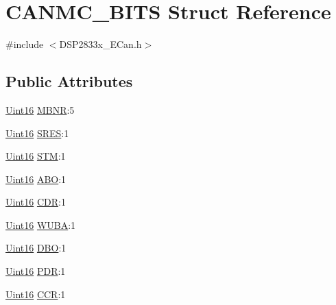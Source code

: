 \hypertarget{struct_c_a_n_m_c___b_i_t_s}{}\section{C\+A\+N\+M\+C\+\_\+\+B\+I\+T\+S Struct Reference}
\label{struct_c_a_n_m_c___b_i_t_s}


{\ttfamily \#include $<$D\+S\+P2833x\+\_\+\+E\+Can.\+h$>$}

\subsection*{Public Attributes}
\begin{DoxyCompactItemize}
\item 
\hyperlink{_d_s_p2833x___device_8h_a59a9f6be4562c327cbfb4f7e8e18f08b}{Uint16} \hyperlink{struct_c_a_n_m_c___b_i_t_s_ab301d33de6106a22a0b255639288a002}{M\+B\+N\+R}\+:5
\item 
\hyperlink{_d_s_p2833x___device_8h_a59a9f6be4562c327cbfb4f7e8e18f08b}{Uint16} \hyperlink{struct_c_a_n_m_c___b_i_t_s_a541dd99a77cdfee4e0f674c8fc817cfa}{S\+R\+E\+S}\+:1
\item 
\hyperlink{_d_s_p2833x___device_8h_a59a9f6be4562c327cbfb4f7e8e18f08b}{Uint16} \hyperlink{struct_c_a_n_m_c___b_i_t_s_a0c5643175a4c559f052919354641c7e6}{S\+T\+M}\+:1
\item 
\hyperlink{_d_s_p2833x___device_8h_a59a9f6be4562c327cbfb4f7e8e18f08b}{Uint16} \hyperlink{struct_c_a_n_m_c___b_i_t_s_a34144b286395f016718ded2f57ddd60d}{A\+B\+O}\+:1
\item 
\hyperlink{_d_s_p2833x___device_8h_a59a9f6be4562c327cbfb4f7e8e18f08b}{Uint16} \hyperlink{struct_c_a_n_m_c___b_i_t_s_a7e14ab8d2e468e8521006a215c453bd6}{C\+D\+R}\+:1
\item 
\hyperlink{_d_s_p2833x___device_8h_a59a9f6be4562c327cbfb4f7e8e18f08b}{Uint16} \hyperlink{struct_c_a_n_m_c___b_i_t_s_a73c0e2436b9618b80afcf9826b5ccffb}{W\+U\+B\+A}\+:1
\item 
\hyperlink{_d_s_p2833x___device_8h_a59a9f6be4562c327cbfb4f7e8e18f08b}{Uint16} \hyperlink{struct_c_a_n_m_c___b_i_t_s_a22e5e64dc3025b6d1ee55c67aba0f0ef}{D\+B\+O}\+:1
\item 
\hyperlink{_d_s_p2833x___device_8h_a59a9f6be4562c327cbfb4f7e8e18f08b}{Uint16} \hyperlink{struct_c_a_n_m_c___b_i_t_s_a11515a696e95a671b820b4359e407124}{P\+D\+R}\+:1
\item 
\hyperlink{_d_s_p2833x___device_8h_a59a9f6be4562c327cbfb4f7e8e18f08b}{Uint16} \hyperlink{struct_c_a_n_m_c___b_i_t_s_a1faef147297bb079b702b94fecfda0e9}{C\+C\+R}\+:1

\end{DoxyCompactItemize}
